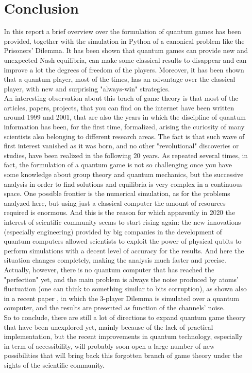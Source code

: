 \hfill

\section{Conclusion}
In this report a brief overview over the formulation of quantum games has been provided, together with the simulation in Python of a canonical problem like the Prisoners' Dilemma. It has been shown that quantum games can provide new and unexpected Nash equilibria, can make some classical results to disappear and can improve a lot the degrees of freedom of the players. Moreover, it has been shown that a quantum player, most of the times, has an advantage over the classical player, with new and surprising "always-win" strategies.\\	
An interesting observation about this brach of game theory is that most of the articles, papers, projects, that you can find on the internet have been written around 1999 and 2001, that are also the years in which the discipline of quantum information has been, for the first time, formalized, arising the curiosity of many scientists also belonging to different research areas. The fact is that such wave of first interest vanished as it was born, and no other "revolutional" discoveries or studies, have been realized in the following 20 years. As repeated several times, in fact, the formulation of a quantum game is not so challenging once you have some knowledge about group theory and quantum mechanics, but the successive analysis in order to find solutions and equilibria is very complex in a continuous space. One possible frontier is the numerical simulation, as for the problems analyzed here, but using just a classical computer the amount of resources required is enormous. And this is the reason for which apparently in 2020 the interest of scientific community seems to start rising again: the new innovations (especially engineering) provided by big companies in the development of quantum computers allowed scientists to exploit the power of physical qubits to perform simulations with a decent level of accuracy for the results. And here the situation changes completely, making the analysis much faster and precise. Actually, however, there is no quantum computer that has reached the "perfection" yet, and the main problem is always the noise produced by atoms' fluctuation (one can think to something similar to bits corruption), as shown also in a recent paper \cite{kairon2020noisy}, in which the 3-player Dilemma is simulated over a quantum computer, and the results are presented as function of the channels' noise.\\
So to conclude, there are still a lot of directions to expand quantum game theory that have been unexplored yet, mainly because of the lack of practical implementation, but the recent improvements in quantum technology, especially in term of accessibility, will probably soon open a large number of new possibilities that will bring back this forgotten branch of game theory under the sights of the scientific community.